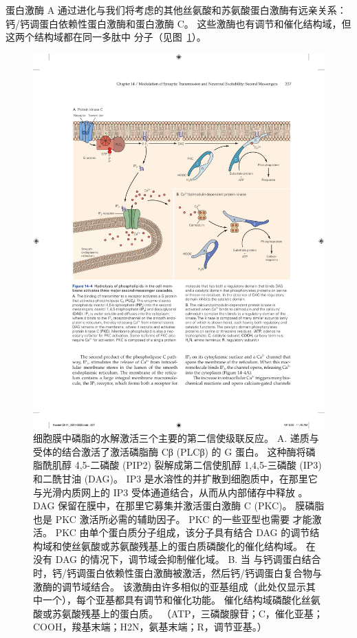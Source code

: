 蛋白激酶 A 通过进化与我们将考虑的其他丝氨酸和苏氨酸蛋白激酶有远亲关系：钙/钙调蛋白依赖性蛋白激酶和蛋白激酶 C。
这些激酶也有调节和催化结构域，但这两个结构域都在同一多肽中 分子（见图~\ref{fig:14_4}）。


\begin{figure}[htbp]
	\centering
	\includegraphics[width=0.95\linewidth]{chap14/fig_14_4}
	\caption{细胞膜中磷脂的水解激活三个主要的第二信使级联反应。 A. 递质与受体的结合激活了激活磷脂酶 Cβ (PLCβ) 的 G 蛋白。 这种酶将磷脂酰肌醇 4,5-二磷酸 (PIP2) 裂解成第二信使肌醇 1,4,5-三磷酸 (IP3) 和二酰甘油 (DAG)。 IP3 是水溶性的并扩散到细胞质中，在那里它与光滑内质网上的 IP3 受体通道结合，从而从内部储存中释放 。 DAG 保留在膜中，在那里它募集并激活蛋白激酶 C (PKC)。 膜磷脂也是 PKC 激活所必需的辅助因子。 PKC 的一些亚型也需要  才能激活。 PKC 由单个蛋白质分子组成，该分子具有结合 DAG 的调节结构域和使丝氨酸或苏氨酸残基上的蛋白质磷酸化的催化结构域。 在没有 DAG 的情况下，调节域会抑制催化域。 B. 当  与钙调蛋白结合时，钙/钙调蛋白依赖性蛋白激酶被激活，然后钙/钙调蛋白复合物与激酶的调节域结合。 该激酶由许多相似的亚基组成（此处仅显示其中一个），每个亚基都具有调节和催化功能。 催化结构域磷酸化丝氨酸或苏氨酸残基上的蛋白质。 （ATP，三磷酸腺苷；C，催化亚基；COOH，羧基末端；H2N，氨基末端；R，调节亚基。）}
	\label{fig:14_4}
\end{figure}


